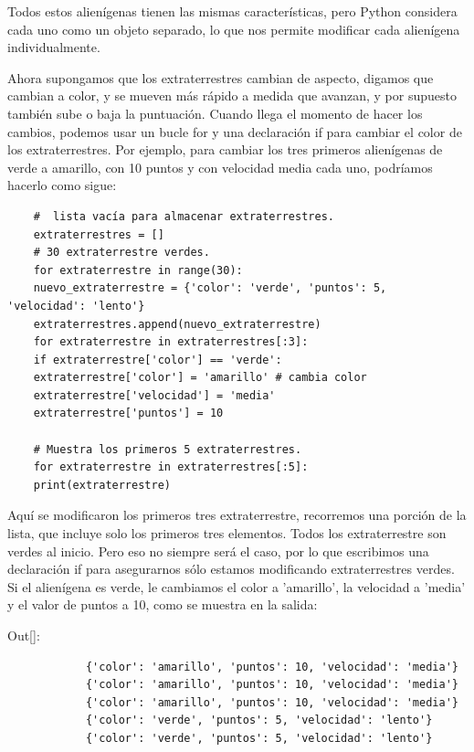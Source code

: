 Todos estos alienígenas tienen las mismas características, pero Python considera cada uno
como un objeto separado, lo que nos permite modificar cada alienígena individualmente.

Ahora supongamos que los extraterrestres cambian de aspecto, digamos que cambian a color, y se mueven más rápido 
a medida que avanzan, y por supuesto también sube o baja la puntuación. Cuando llega el momento de hacer los  cambios, podemos usar un bucle {\ttfamily for} y una declaración {\ttfamily if} para cambiar el color de los extraterrestres. Por ejemplo, para cambiar los tres primeros alienígenas de verde a amarillo, con 10 puntos y con velocidad media cada uno,
podríamos hacerlo como sigue:

\hspace{-2.5cm}{\ttfamily \scriptsize aliens.py}  \vspace{-0.5cm}
\begin{lstlisting}	
	#  lista vacía para almacenar extraterrestres.
	extraterrestres = []
	# 30 extraterrestre verdes.
	for extraterrestre in range(30):
	nuevo_extraterrestre = {'color': 'verde', 'puntos': 5, 'velocidad': 'lento'}
	extraterrestres.append(nuevo_extraterrestre)
	for extraterrestre in extraterrestres[:3]:
	if extraterrestre['color'] == 'verde':
	extraterrestre['color'] = 'amarillo' # cambia color
	extraterrestre['velocidad'] = 'media'
	extraterrestre['puntos'] = 10
	
	# Muestra los primeros 5 extraterrestres.
	for extraterrestre in extraterrestres[:5]:
	print(extraterrestre)
\end{lstlisting}	

Aquí se modificaron los primeros tres extraterrestre, recorremos una porción de la lista, que incluye solo los primeros tres elementos. Todos los extraterrestre son verdes al inicio.  Pero eso no siempre será el caso, por lo que escribimos una declaración {\ttfamily if} para asegurarnos sólo estamos modificando extraterrestres verdes. Si el alienígena es verde, le cambiamos el color a 'amarillo', la velocidad a 'media' y el valor de puntos a 10, como se muestra en la salida:

{\ttfamily\scriptsize\scriptsize \noindent Out[]:\vspace{-0.3cm}	
	{\color{blue} 	
		\begin{verbatim}
			{'color': 'amarillo', 'puntos': 10, 'velocidad': 'media'}
			{'color': 'amarillo', 'puntos': 10, 'velocidad': 'media'}
			{'color': 'amarillo', 'puntos': 10, 'velocidad': 'media'}
			{'color': 'verde', 'puntos': 5, 'velocidad': 'lento'}
			{'color': 'verde', 'puntos': 5, 'velocidad': 'lento'}
		\end{verbatim}
}}

